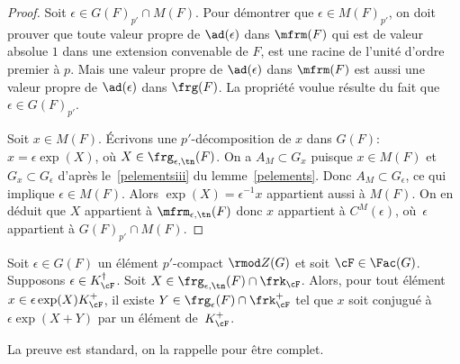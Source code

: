 \begin{proof}
Soit $\epsilon\in G(F)_{p'}\cap M(F)$. Pour démontrer que $\epsilon\in M(F)_{p'}$, on doit prouver que toute valeur propre de $\ad(\epsilon)$ dans $\mfrm(F)$ qui est de valeur absolue $1$ dans une extension convenable de $F$, est une racine de l'unité d'ordre premier à $p$. Mais une valeur propre de $\ad(\epsilon)$ dans $\mfrm(F)$ est aussi une valeur propre de $\ad(\epsilon)$ dans $\frg(F)$. La propriété voulue résulte du fait que $\epsilon\in G(F)_{p'}$.

Soit $x\in M(F)$.
Écrivons une $p'$-décomposition de $x$ dans $G(F)$: $x=\epsilon \exp(X)$, où $X\in \frg_{\epsilon,\tn}(F)$.
On a $A_{M}\subset G_{x} $ puisque $x\in M(F)$ et $G_{x}\subset G_{\epsilon}$ d'après le~\eqref{pelementsiii} du lemme~\ref{pelements}. Donc $A_{M}\subset G_{\epsilon}$, ce qui implique $\epsilon\in M(F)$. Alors $\exp(X)=\epsilon^{-1}x$ appartient aussi à $M(F)$. On en déduit que $X$ appartient à $\mfrm_{\epsilon,\tn}(F)$ donc $x$ appartient à $C^M(\epsilon)$, où~$\epsilon$ appartient à $G(F)_{p'}\cap M(F)$.
\end{proof}

\label{commutant}

\begin{lem*}
Soit $\epsilon\in G(F)$ un élément $p'$-compact $\rmod Z(G)$ et soit $\cF\in \Fac(G)$. Supposons $\epsilon\in K_{\cF}^{\dag}$. Soit $X\in \frg_{\epsilon,\tn}(F)\cap \frk_{\cF}$. Alors, pour tout élément $x\in \epsilon \exp(X) K_{\cF}^+$, il existe $Y\in \frg_{\epsilon}(F)\cap \frk_{\cF}^+$ tel que $x$ soit conjugué à $\epsilon \exp(X+Y)$ par un élément de~$K_{\cF}^+$.
\end{lem*}

La preuve est standard, on la rappelle pour être complet.

